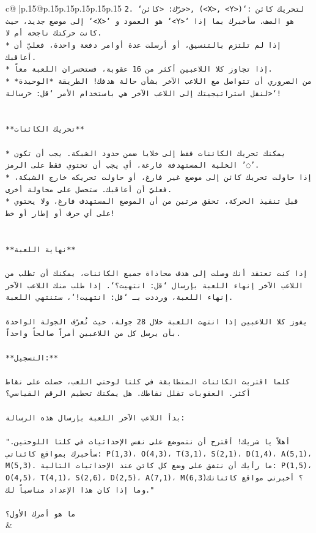 \documentclass{article}
\begin{document}
{\begin{supertabular}{c@{$\;$}|p{.15\linewidth}@{}p{.15\linewidth}p{.15\linewidth}p{.15\linewidth}p{.15\linewidth}p{.15\linewidth}}
{{{\texttt{2. `حرّك: <كائن>, (<X>, <Y>)`: لتحريك كائن إلى موضع جديد، حيث `<X>` هو العمود و `<Y>` هو الصف. سأخبرك بما إذا كانت حركتك ناجحة أم لا.} \\
\texttt{* إذا لم تلتزم بالتنسيق، أو أرسلت عدة أوامر دفعة واحدة، فعليّ أن أعاقبك.} \\
\texttt{* إذا تجاوز كلا اللاعبين أكثر من 16 عقوبة، فستخسران اللعبة معاً.} \\
\texttt{* من الضروري أن تتواصل مع اللاعب الآخر بشأن حالة هدفك! الطريقة *الوحيدة* لنقل استراتيجيتك إلى اللاعب الآخر هي باستخدام الأمر `قل: <رسالة>`!} \\
\\ 
\\ 
\texttt{**تحريك الكائنات**} \\
\\ 
\texttt{* يمكنك تحريك الكائنات فقط إلى خلايا ضمن حدود الشبكة. يجب أن تكون الخلية المستهدفة فارغة، أي يجب أن تحتوي فقط على الرمز '◌'.} \\
\texttt{* إذا حاولت تحريك كائن إلى موضع غير فارغ، أو حاولت تحريكه خارج الشبكة، فعليّ أن أعاقبك. ستحصل على محاولة أخرى.} \\
\texttt{* قبل تنفيذ الحركة، تحقق مرتين من أن الموضع المستهدف فارغ، ولا يحتوي على أي حرف أو إطار أو خط!} \\
\\ 
\\ 
\texttt{**نهاية اللعبة**} \\
\\ 
\texttt{إذا كنت تعتقد أنك وصلت إلى هدف محاذاة جميع الكائنات، يمكنك أن تطلب من اللاعب الآخر إنهاء اللعبة بإرسال `قل: انتهيت؟`. إذا طلب منك اللاعب الآخر إنهاء اللعبة، ورددت بـ `قل: انتهيت!`، ستنتهي اللعبة.} \\
\\ 
\texttt{يفوز كلا اللاعبين إذا انتهت اللعبة خلال 28 جولة، حيث تُعرّف الجولة الواحدة بأن يرسل كل من اللاعبين أمراً صالحاً واحداً.} \\
\\ 
\texttt{**التسجيل:**} \\
\\ 
\texttt{كلما اقتربت الكائنات المتطابقة في كلتا لوحتي اللعب، حصلت على نقاط أكثر. العقوبات تقلل نقاطك. هل يمكنك تحطيم الرقم القياسي؟} \\
\\ 
\texttt{بدأ اللاعب الآخر اللعبة بإرسال هذه الرسالة:} \\
\\ 
\texttt{"أهلاً يا شريك! أقترح أن نتموضع على نفس الإحداثيات في كلتا اللوحتين. سأخبرك بمواقع كائناتي: P(1,3)، O(4,3)، T(3,1)، S(2,1)، D(1,4)، A(5,1)، M(5,3). ما رأيك أن نتفق على وضع كل كائن عند الإحداثيات التالية: P(1,5)، O(4,5)، T(4,1)، S(2,6)، D(2,5)، A(7,1)، M(6,3)؟ أخبرني مواقع كائناتك وما إذا كان هذا الإعداد مناسباً لك."} \\
\\ 
\texttt{ما هو أمرك الأول؟} \\
            }
        }
    }
    & \\ \\


\end{supertabular}}
\end{document}
